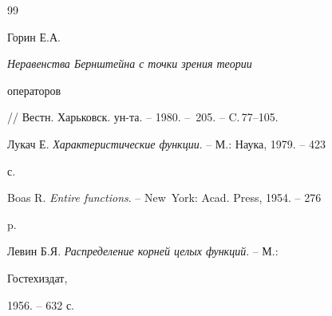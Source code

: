\begin{thebibliography}{99}


Горин Е.А. {\em Неравенства Бернштейна с точки зрения теории 


операторов} 


// Вестн. Харьковск. ун-та. -- 1980. -- \No\,205. -- C.\,77--105. 




Лукач Е. {\em Характеристические функции}. -- М.: Наука, 1979. -- 423 


с. 




Boas R. {\em Entire functions}. -- New~York: Acad. Press, 1954. -- 276 


p. 




Левин Б.Я. {\em Распределение корней целых функций}. -- М.: 


Гостехиздат, 


1956. -- 632 с. 


 


\end{thebibliography} 


 


\vskip 2cm 


 








 


\label{end} 


 


